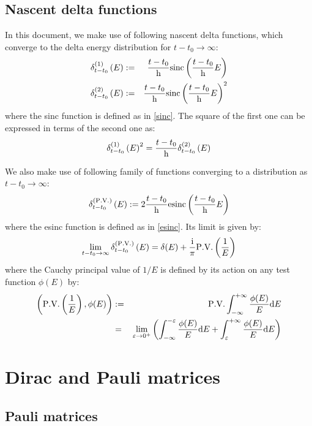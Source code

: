 \documentclass[10pt,a4paper,twoside,openany]{book}
\begin{document}
\section{Nascent delta functions}
\label{delta}

In this document, we make use of following nascent delta functions, which converge to the delta energy distribution for $t - t_0 \to \infty$:
\begin{eqnarray*}
\delta^{({1})}_{t - t_0} \left({E}\right) & := & \frac{t - t_0} {\mathrm h} \mathrm{sinc} \left( {\frac{t - t_0} {\mathrm h} E} \right) \\
\delta^{({2})}_{t - t_0} \left({E}\right) & := & \frac{t - t_0} {\mathrm h} \mathrm{sinc} \left( {\frac{t - t_0} {\mathrm h} E} \right)^2
\end{eqnarray*}
where the sinc function is defined as in \ref{sinc}. The square of the first one can be expressed in terms of the second one as:
\begin{equation*}
\delta^{({1})}_{t - t_0} \left({E}\right)^2 = \frac{t - t_0} {\mathrm h} \delta^{({2})}_{t - t_0} \left({E}\right)
\end{equation*}

We also make use of following family of functions converging to a distribution as $t - t_0 \to \infty$:
\begin{equation*}
\delta^{({\mathrm{P.V.}})}_{t - t_0} \left({E}\right) := 2 \frac{t - t_0} {\mathrm h} \mathrm{esinc} \left( {\frac{t - t_0} {\mathrm h} E} \right)
\end{equation*}
where the esinc function is defined as in \ref{esinc}. Its limit is given by:
\begin{equation*}
\lim_{t - t_0 \to \infty} \delta^{({\mathrm{P.V.}})}_{t - t_0} \left({E}\right) = \delta(E) + \frac {\mathrm{i}} \pi \mathrm{P.V.} \left( \frac 1 E \right)
\end{equation*}
where the Cauchy principal value of $1/E$ is defined by its action on any test function $\phi(E)$ by:
\begin{eqnarray*}
\left( \mathrm{P.V.} \left( \frac 1 E \right), \phi(E) \right) & := & \mathrm{P.V.} \int_{-\infty}^{+\infty} \frac{\phi(E)}E \mathrm dE \\
& = & \lim_{\varepsilon \to 0^+} \left( \int_{-\infty}^{-\varepsilon} \frac{\phi(E)}E \mathrm dE + \int_{\varepsilon}^{+\infty} \frac{\phi(E)}E \mathrm dE \right)
\end{eqnarray*}

\chapter{Dirac and Pauli matrices}

\section{Pauli matrices}
\end{document}
